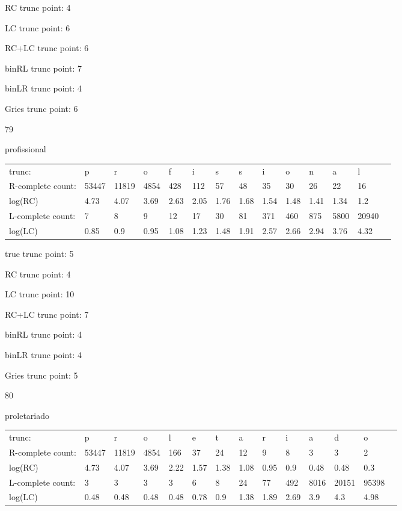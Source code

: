 \documentclass[10pt]{article}
\begin{document}
RC trunc point: 4

LC trunc point: 6

RC+LC trunc point: 6

binRL trunc point: 7

binLR trunc point: 4

Gries trunc point: 6

\vspace{1em}

79

profissional

\begin{tabular}{l|lllllllllllll}
trunc: & p & r & o & f & i & s & s & i & o & n & a & l & \\ 
R-complete count: & 53447 & 11819 & 4854 & 428 & 112 & 57 & 48 & 35 & 30 & 26 & 22 & 16 & \\ 
log(RC) & 4.73 & 4.07 & 3.69 & 2.63 & 2.05 & 1.76 & 1.68 & 1.54 & 1.48 & 1.41 & 1.34 & 1.2 & \\ 
L-complete count: & 7 & 8 & 9 & 12 & 17 & 30 & 81 & 371 & 460 & 875 & 5800 & 20940 & \\ 
log(LC) & 0.85 & 0.9 & 0.95 & 1.08 & 1.23 & 1.48 & 1.91 & 2.57 & 2.66 & 2.94 & 3.76 & 4.32 & \\ 
\end{tabular}

true trunc point: 5

RC trunc point: 4

LC trunc point: 10

RC+LC trunc point: 7

binRL trunc point: 4

binLR trunc point: 4

Gries trunc point: 5

\vspace{1em}

80

proletariado

\begin{tabular}{l|lllllllllllll}
trunc: & p & r & o & l & e & t & a & r & i & a & d & o & \\ 
R-complete count: & 53447 & 11819 & 4854 & 166 & 37 & 24 & 12 & 9 & 8 & 3 & 3 & 2 & \\ 
log(RC) & 4.73 & 4.07 & 3.69 & 2.22 & 1.57 & 1.38 & 1.08 & 0.95 & 0.9 & 0.48 & 0.48 & 0.3 & \\ 
L-complete count: & 3 & 3 & 3 & 3 & 6 & 8 & 24 & 77 & 492 & 8016 & 20151 & 95398 & \\ 
log(LC) & 0.48 & 0.48 & 0.48 & 0.48 & 0.78 & 0.9 & 1.38 & 1.89 & 2.69 & 3.9 & 4.3 & 4.98 & \\ 
\end{tabular}
\end{document}
